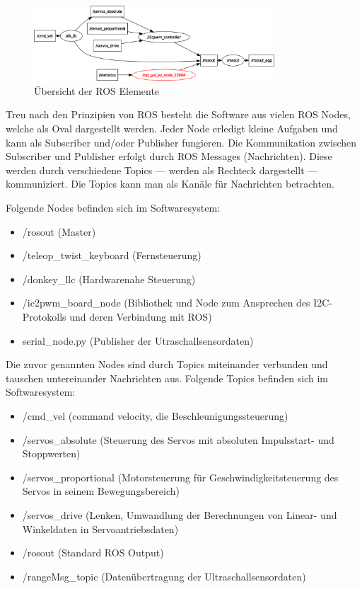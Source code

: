 \documentclass[conference]{IEEEtran}
\begin{document}
\begin{figure}[!ht] 
	\centering
	\includegraphics[width=9cm]{img/rosgraph.png}
	\caption{Übersicht der ROS Elemente}
	\label{rosgraph}
\end{figure}

Treu nach den Prinzipien von ROS besteht die Software aus vielen ROS Nodes, welche als Oval dargestellt werden. 
Jeder Node erledigt kleine Aufgaben und kann als Subscriber und/oder Publisher fungieren.
Die Kommunikation zwischen Subscriber und Publisher erfolgt durch ROS Messages (Nachrichten).
Diese werden durch verschiedene Topics — werden als Rechteck dargestellt — kommuniziert.
Die Topics kann man als Kanäle für Nachrichten betrachten.

Folgende Nodes befinden sich im Softwaresystem:
\begin{itemize}
	\item /rosout (Master)
	\item /teleop\_twist\_keyboard (Fernsteuerung)
	\item /donkey\_llc (Hardwarenahe Steuerung)
	\item /ic2pwm\_board\_node (Bibliothek und Node zum Ansprechen des I2C-Protokolls und deren Verbindung mit ROS)
	\item serial\_node.py (Publisher der Utraschallsensordaten)
\end{itemize}

Die zuvor genannten Nodes sind durch Topics miteinander verbunden und tauschen untereinander Nachrichten aus.
Folgende Topics befinden sich im Softwaresystem:
\begin{itemize}
	\item /cmd\_vel (command velocity, die Beschleunigungssteuerung)
	\item /servos\_absolute (Steuerung des Servos mit absoluten Impulsstart- und Stoppwerten)
	\item /servos\_proportional (Motorsteuerung für Geschwindigkeitsteuerung des Servos in seinem Bewegungsbereich)
	\item /servos\_drive (Lenken, Umwandlung der Berechnungen von Linear- und Winkeldaten in Servoantriebsdaten)
	\item /rosout (Standard ROS Output)
	\item /rangeMsg\_topic (Datenübertragung der Ultraschallsensordaten)
\end{itemize}
\end{document}
